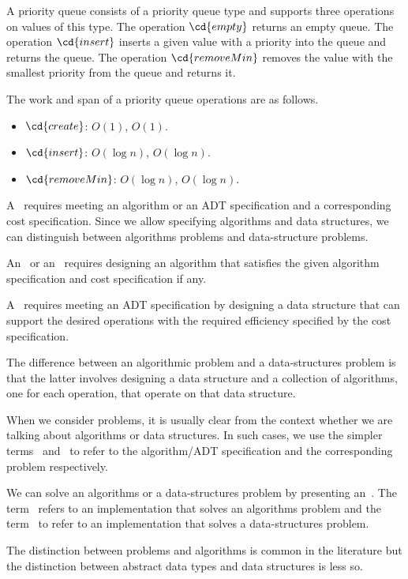 A priority queue consists of a priority queue type and supports three
operations on values of this type.  The operation $\cd{empty}$ returns
an empty queue.  The operation $\cd{insert}$ inserts a given value with
a priority into the queue and returns the queue.  The operation
$\cd{removeMin}$ removes the value with the smallest priority from the
queue and returns it.

The work and span of a priority queue operations are as follows.
\begin{itemize}
\item $\cd{create}$: $O(1)$, $O(1)$.
\item $\cd{insert}$: $O(\log{n})$, $O(\log{n})$.
\item $\cd{removeMin}$: $O(\log{n})$, $O(\log{n})$.
\end{itemize}

A~ requires meeting an algorithm or an ADT specification
and a corresponding cost specification.
%
Since we allow specifying algorithms and data structures, we can
distinguish between algorithms problems and data-structure problems.
%

An~ or an~
requires designing an algorithm that satisfies the given algorithm
specification and cost specification if any.
%

A~ requires meeting an ADT
specification by designing a data structure that can
support the desired operations with the required efficiency specified
by the cost specification.
%

The difference between an algorithmic problem and a data-structures
problem is that the latter involves designing a data structure and a
collection of algorithms, one for each operation, that operate on that
data structure.

When we consider problems, it is usually clear from the context
whether we are talking about algorithms or data structures.
%
In such cases, we use the simpler terms~
and~ to refer to the algorithm/ADT specification and the
corresponding problem respectively.

We can solve an algorithms or a data-structures problem by presenting
an~.  
%
The term~ refers to an implementation that solves an
algorithms problem and the term~ to
refer to an implementation that solves a data-structures problem.

The distinction between problems and algorithms is common in the
literature but the distinction between abstract data types and data
structures is less so.

